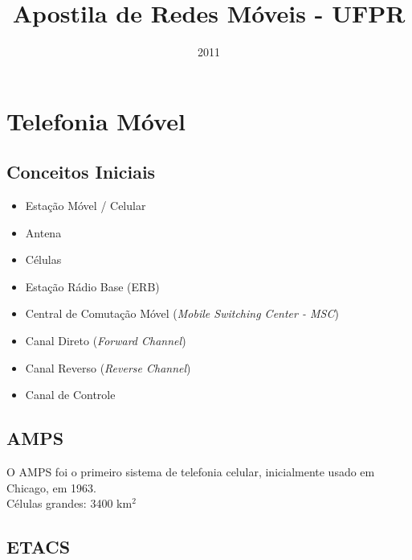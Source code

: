 \documentclass{article}
\title{Apostila de Redes Móveis - UFPR}
\date{2011}
\begin{document}
\maketitle
\tableofcontents


\newpage



\section{Telefonia Móvel}


\subsection{Conceitos Iniciais}

\begin{itemize}
	\item Estação Móvel / Celular
	\item Antena
	\item Células
	\item Estação Rádio Base (ERB)
	\item Central de Comutação Móvel (\textit{Mobile Switching Center - MSC})
	\item Canal Direto (\textit{Forward Channel})
	\item Canal Reverso (\textit{Reverse Channel})
	\item Canal de Controle
\end{itemize}


\subsection{AMPS}

O AMPS foi o primeiro sistema de telefonia celular, inicialmente usado em
Chicago, em 1963.\\

Células grandes: 3400 km$^2$

\subsection{ETACS}





\printindex
\end{document}
